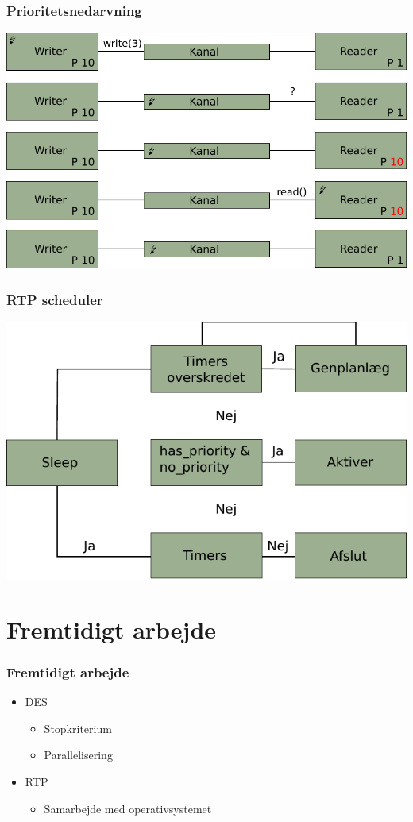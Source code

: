 \documentclass[12pt]{beamer}
\begin{document}
\begin{frame}[t]
  \frametitle{Prioritetsnedarvning}
\vspace{1.2cm}
\includegraphics[scale=0.7]{nedarvning5} 
\end{frame}

\begin{frame}
  \frametitle{RTP scheduler}
\includegraphics[scale=0.9]{rtp-scheduler}
\end{frame}

\section{Fremtidigt arbejde}
\begin{frame}
  	\frametitle{Fremtidigt arbejde}
\begin{itemize}
\item DES
	\begin{itemize}
	\item Stopkriterium
	\item Parallelisering
	\end{itemize}
\item RTP
	\begin{itemize}
	\item Samarbejde med operativsystemet
	\end{itemize}
\end{itemize}
\end{frame}
 
\end{document}
